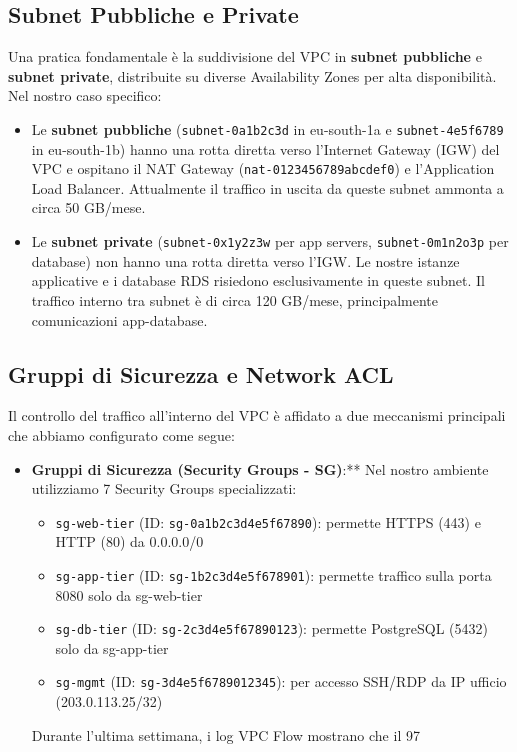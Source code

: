 \subsection{Subnet Pubbliche e Private}
\label{subsec:subnets}
Una pratica fondamentale è la suddivisione del VPC in \textbf{subnet pubbliche} e \textbf{subnet private}, distribuite su diverse Availability Zones per alta disponibilità. Nel nostro caso specifico:
\begin{itemize}
    \item Le \textbf{subnet pubbliche} (\texttt{subnet-0a1b2c3d} in eu-south-1a e \texttt{subnet-4e5f6789} in eu-south-1b) hanno una rotta diretta verso l'Internet Gateway (IGW) del VPC e ospitano il NAT Gateway (\texttt{nat-0123456789abcdef0}) e l'Application Load Balancer. Attualmente il traffico in uscita da queste subnet ammonta a circa 50 GB/mese.
    \item Le \textbf{subnet private} (\texttt{subnet-0x1y2z3w} per app servers, \texttt{subnet-0m1n2o3p} per database) non hanno una rotta diretta verso l'IGW. Le nostre istanze applicative e i database RDS risiedono esclusivamente in queste subnet. Il traffico interno tra subnet è di circa 120 GB/mese, principalmente comunicazioni app-database.
\end{itemize}

\subsection{Gruppi di Sicurezza e Network ACL}
\label{subsec:sg-nacl}
Il controllo del traffico all'interno del VPC è affidato a due meccanismi principali che abbiamo configurato come segue:
\begin{itemize}
    \item \textbf{Gruppi di Sicurezza (Security Groups - SG)}:** Nel nostro ambiente utilizziamo 7 Security Groups specializzati:
        \begin{itemize}
            \item \texttt{sg-web-tier} (ID: \texttt{sg-0a1b2c3d4e5f67890}): permette HTTPS (443) e HTTP (80) da 0.0.0.0/0
            \item \texttt{sg-app-tier} (ID: \texttt{sg-1b2c3d4e5f678901}): permette traffico sulla porta 8080 solo da sg-web-tier
            \item \texttt{sg-db-tier} (ID: \texttt{sg-2c3d4e5f67890123}): permette PostgreSQL (5432) solo da sg-app-tier
            \item \texttt{sg-mgmt} (ID: \texttt{sg-3d4e5f6789012345}): per accesso SSH/RDP da IP ufficio (203.0.113.25/32)
        \end{itemize}
        Durante l'ultima settimana, i log VPC Flow mostrano che il 97%
\end{itemize}

